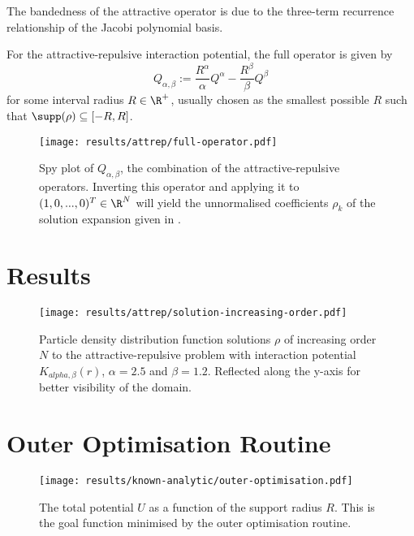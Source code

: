 The bandedness of the attractive operator is due to the three-term recurrence relationship of the Jacobi polynomial basis.

For the attractive-repulsive interaction potential, the full operator is given by
\begin{equation}
  Q_{\alpha, \beta} := \frac{R^\alpha}{\alpha} Q^\alpha - \frac{R^\beta}{\beta} Q^\beta
  \label{eq:full-attrep-operator}
\end{equation}
for some interval radius $R \in \R^+$, usually chosen as the smallest possible $R$ such that $\supp(\rho) \subseteq [-R, R]$.

\begin{figure}[H]
  \centering
  \label{fig:attrep-operator}
  \texttt{[image: results/attrep/full-operator.pdf]}
  \caption[Combination of the attractive-repulsive operators]{Spy plot of $Q_{\alpha, \beta}$, the combination of the attractive-repulsive operators. Inverting this operator and applying it to $(1, 0, ..., 0)^T \in \R^N$ will yield the unnormalised coefficients $\rho_k$ of the solution expansion given in .}
\end{figure}

\section{Results}
\begin{figure}[H]
  \centering
  \label{fig:solution-increasing-order}
  \texttt{[image: results/attrep/solution-increasing-order.pdf]}
  \caption[Solutions of increasing orders]{Particle density distribution function solutions $\rho$ of increasing order $N$ to the attractive-repulsive problem with interaction potential $K_{alpha, \beta}(r)$, $\alpha = 2.5$ and $\beta = 1.2$. Reflected along the y-axis for better visibility of the domain.}
\end{figure}

\section{Outer Optimisation Routine}
\begin{figure}[H]
  \centering
  \label{fig:outer-optimisation}
  \texttt{[image: results/known-analytic/outer-optimisation.pdf]}
  \caption[Outer Optimisation Routine]{The total potential $U$ as a function of the support radius $R$. This is the goal function minimised by the outer optimisation routine.}
\end{figure}

